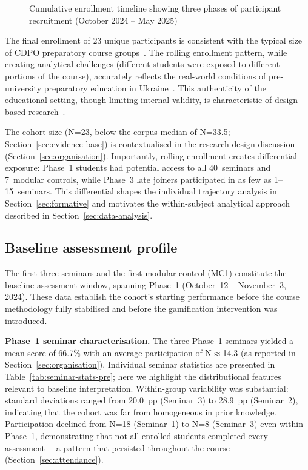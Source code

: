 \begin{figure}[!h]
\centering

\caption{Cumulative enrollment timeline showing three phases of participant recruitment (October 2024 -- May 2025)}
\label{fig:enrollment}
\end{figure}

The final enrollment of 23 unique participants is consistent with the typical size of CDPO preparatory course groups~\cite{KSPU}. The rolling enrollment pattern, while creating analytical challenges (different students were exposed to different portions of the course), accurately reflects the real-world conditions of pre-university preparatory education in Ukraine~\cite{MON}. This authenticity of the educational setting, though limiting internal validity, is characteristic of design-based research~\cite{Reeves2003, creswell, Sanina2020}.

The cohort size (N=23, below the corpus median of N=33.5; Section~\ref{sec:evidence-base}) is contextualised in the research design discussion (Section~\ref{sec:organisation}). Importantly, rolling enrollment creates differential exposure: Phase~1 students had potential access to all 40~seminars and 7~modular controls, while Phase~3 late joiners participated in as few as 1--15~seminars. This differential shapes the individual trajectory analysis in Section~\ref{sec:formative} and motivates the within-subject analytical approach described in Section~\ref{sec:data-analysis}.

\subsection{Baseline assessment profile}

The first three seminars and the first modular control (MC1) constitute the baseline assessment window, spanning Phase~1 (October~12 -- November~3, 2024). These data establish the cohort's starting performance before the course methodology fully stabilised and before the gamification intervention was introduced.

\textbf{Phase~1 seminar characterisation.} The three Phase~1 seminars yielded a mean score of 66.7\% with an average participation of N$\approx$14.3 (as reported in Section~\ref{sec:organisation}). Individual seminar statistics are presented in Table~\ref{tab:seminar-stats-pre}; here we highlight the distributional features relevant to baseline interpretation. Within-group variability was substantial: standard deviations ranged from 20.0~pp (Seminar~3) to 28.9~pp (Seminar~2), indicating that the cohort was far from homogeneous in prior knowledge. Participation declined from N=18 (Seminar~1) to N=8 (Seminar~3) even within Phase~1, demonstrating that not all enrolled students completed every assessment~-- a pattern that persisted throughout the course (Section~\ref{sec:attendance}).


